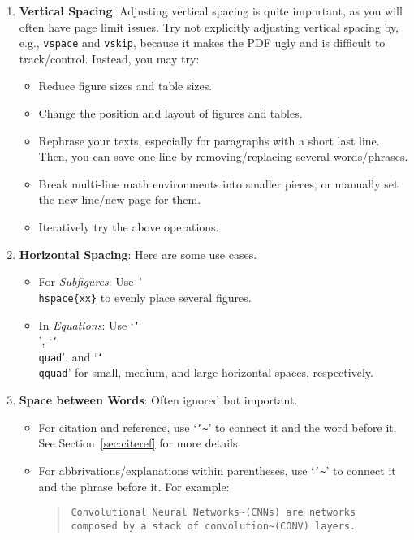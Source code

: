 \begin{enumerate}
  \item \textbf{Vertical Spacing}:
    Adjusting vertical spacing is quite important, as you will often have page limit issues.
    Try not explicitly adjusting vertical spacing by, e.g., \texttt{vspace} and \texttt{vskip}, because it makes the PDF ugly and is difficult to track/control.
    Instead, you may try:
  \begin{itemize}
    \item Reduce figure sizes and table sizes.
    \item Change the position and layout of figures and tables.
    \item Rephrase your texts, especially for paragraphs with a short last line. Then, you can save one line by removing/replacing several words/phrases.
    \item Break multi-line math environments into smaller pieces, or manually set the new line/new page for them.
    \item Iteratively try the above operations.
  \end{itemize}

  \item \textbf{Horizontal Spacing}:
    Here are some use cases.
  \begin{itemize}
    \item For \textit{Subfigures}: Use \texttt{\char`\\hspace\{xx\}} to evenly place several figures.
    \item In \textit{Equations}: Use `\texttt{\char`\\ }', `\texttt{\char`\\quad}', and `\texttt{\char`\\qquad}' for small, medium, and large horizontal spaces, respectively.
  \end{itemize}

  \item \textbf{Space between Words}:
    Often ignored but important.
  \begin{itemize}
    \item For citation and reference, use `\texttt{\char`\~}' to connect it and the word before it. See Section~\ref{sec:citeref} for more details.
    \item For abbrivations/explanations within parentheses, use `\texttt{\char`\~}' to connect it and the phrase before it. For example:
    \begin{quote}\begin{scriptsize}
      \begin{verbatim}
Convolutional Neural Networks~(CNNs) are networks
composed by a stack of convolution~(CONV) layers.
      \end{verbatim}
      

\end{scriptsize}
\end{quote}
\end{itemize}
\end{enumerate}
